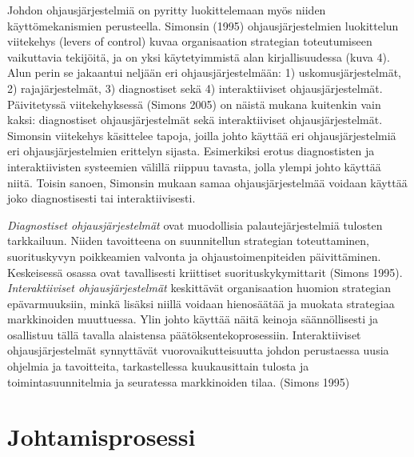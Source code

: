 \documentclass[12pt,a4paper,oneside,pdftex]{report}
\begin{document}
Johdon ohjausjärjestelmiä on pyritty luokittelemaan myös niiden käyttömekanismien perusteella. Simonsin (1995) ohjausjärjestelmien luokittelun viitekehys (levers of control) kuvaa organisaation strategian toteutumiseen vaikuttavia tekijöitä, ja on yksi käytetyimmistä alan kirjallisuudessa (kuva 4). Alun perin se jakaantui neljään eri ohjausjärjestelmään: 1) uskomusjärjestelmät, 2) rajajärjestelmät, 3) diagnostiset sekä 4) interaktiiviset ohjausjärjestelmät. Päivitetyssä viitekehyksessä (Simons 2005) on näistä mukana kuitenkin vain kaksi: diagnostiset ohjausjärjestelmät sekä interaktiiviset ohjausjärjestelmät. Simonsin viitekehys käsittelee tapoja, joilla johto käyttää eri ohjausjärjestelmiä eri ohjausjärjestelmien erittelyn sijasta. Esimerkiksi erotus diagnostisten ja interaktiivisten systeemien välillä riippuu tavasta, jolla ylempi johto käyttää niitä. Toisin sanoen, Simonsin mukaan samaa ohjausjärjestelmää voidaan käyttää joko diagnostisesti tai interaktiivisesti.

\emph{Diagnostiset ohjausjärjestelmät} ovat muodollisia palautejärjestelmiä tulosten tarkkailuun. Niiden tavoitteena on suunnitellun strategian toteuttaminen, suorituskyvyn poikkeamien valvonta ja ohjaustoimenpiteiden päivittäminen. Keskeisessä osassa ovat tavallisesti kriittiset suorituskykymittarit (Simons 1995). \emph{Interaktiiviset ohjausjärjestelmät} keskittävät organisaation huomion strategian epävarmuuksiin, minkä lisäksi niillä voidaan hienosäätää ja muokata strategiaa markkinoiden muuttuessa. Ylin johto käyttää näitä keinoja säännöllisesti ja osallistuu tällä tavalla alaistensa päätöksentekoprosessiin. Interaktiiviset ohjausjärjestelmät synnyttävät vuorovaikutteisuutta johdon perustaessa uusia ohjelmia ja tavoitteita, tarkastellessa kuukausittain tulosta ja toimintasuunnitelmia ja seuratessa markkinoiden tilaa. (Simons 1995)

\section{Johtamisprosessi}
\end{document}
